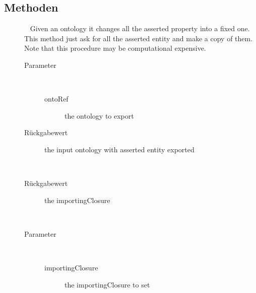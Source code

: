 \subsection{Methoden}
\begin{description}
\item[{\label{ontologyFramework.OFContextManagement.InferedAxiomExporter.exportOntology(ontologyFramework.OFContextManagement.OWLReferences)}}]
~ Given an ontology it changes all the asserted 
 property into a fixed one. This method just ask 
 for all the asserted entity and make a copy of them. 
 Note that this procedure may be computational expensive.
\begin{description}
\item[Parameter] ~
\begin{description}
\item[ontoRef]
the ontology to export
\end{description}
\item[Rückgabewert] 
the input ontology with asserted entity exported
\end{description}
\item[{\label{ontologyFramework.OFContextManagement.InferedAxiomExporter.isImportingClosure()}}]
~ 
\begin{description}
\item[Rückgabewert] 
the importingClosure
\end{description}
\item[{\label{ontologyFramework.OFContextManagement.InferedAxiomExporter.setImportingClosure(boolean)}}]
~ 
\begin{description}
\item[Parameter] ~
\begin{description}
\item[importingClosure]
the importingClosure to set
\end{description}
\end{description}
\end{description}
